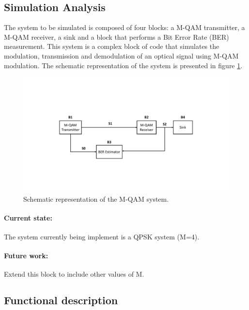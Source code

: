 \pagebreak
\subsection{Simulation Analysis}

The system to be simulated is composed of four blocks: a M-QAM transmitter, a M-QAM receiver, a sink and a block that performs a Bit Error Rate (BER) measurement. This system is a complex block of code that simulates the modulation, transmission and demodulation of an optical signal using M-QAM modulation. The schematic representation of the
system is presented in figure \ref{MQAM_system_block_diagram}. 

\begin{figure}[!b]
	\centering
	\includegraphics[trim={4cm 4cm 4cm 6cm},clip,width=\textwidth]{./sdf/m_qam_system/figures/MQAM_system_block_diagram.pdf}
	\caption{Schematic representation of the M-QAM system.}\label{MQAM_system_block_diagram}
\end{figure}


\paragraph{Current state:} The system currently being implement is a QPSK system (M=4).

\paragraph{Future work:} Extend this block to include other values of M.

\subsection*{Functional description}

